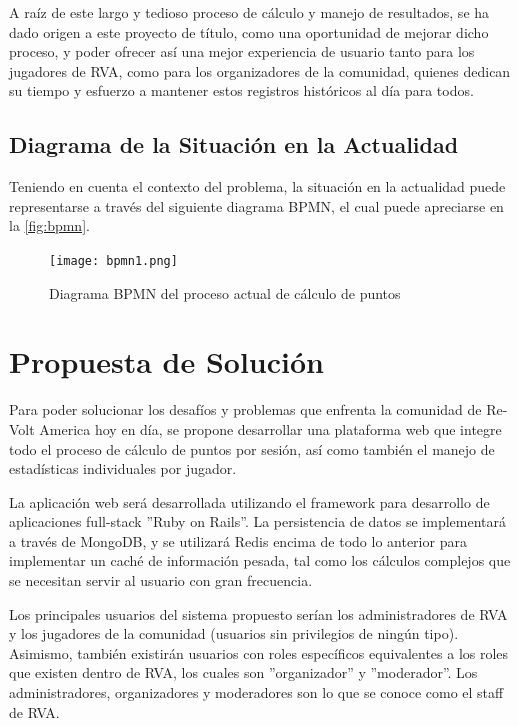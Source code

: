 A raíz de este largo y tedioso proceso de cálculo y manejo de resultados, se ha dado origen a este proyecto de título, como una oportunidad de mejorar dicho proceso, y poder ofrecer así una mejor experiencia de usuario tanto para los jugadores de RVA, como para los organizadores de la comunidad, quienes dedican su tiempo y esfuerzo a mantener estos registros históricos al día para todos.

\subsection{Diagrama de la Situación en la Actualidad}
Teniendo en cuenta el contexto del problema, la situación en la actualidad puede representarse a través del siguiente diagrama BPMN, el cual puede apreciarse en la \autoref{fig:bpmn}.

\begin{figure}[H]
  \begin{center}
    \texttt{[image: bpmn1.png]}
  \end{center}
  \caption[Diagrama BPMN del proceso actual de cálculo de puntos]{Diagrama BPMN del proceso actual de cálculo de puntos}
  \label{fig:bpmn}
\end{figure}

\section{Propuesta de Solución}
Para poder solucionar los desafíos y problemas que enfrenta la comunidad de Re-Volt America hoy en día, se propone desarrollar una plataforma web que integre todo el proceso de cálculo de puntos por sesión, así como también el manejo de estadísticas individuales por jugador.

La aplicación web será desarrollada utilizando el framework para desarrollo de aplicaciones full-stack ''Ruby on Rails''. La persistencia de datos se implementará a través de MongoDB, y se utilizará Redis encima de todo lo anterior para implementar un caché de información pesada, tal como los cálculos complejos que se necesitan servir al usuario con gran frecuencia.

Los principales usuarios del sistema propuesto serían los administradores de RVA y los jugadores de la comunidad (usuarios sin privilegios de ningún tipo). Asimismo, también existirán usuarios con roles específicos equivalentes a los roles que existen dentro de RVA, los cuales son ''organizador'' y ''moderador''. Los administradores, organizadores y moderadores son lo que se conoce como el staff de RVA.

